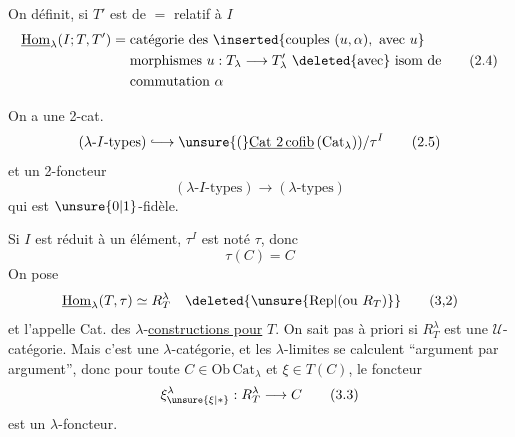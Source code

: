 On définit, si $T'$ est de $=$ relatif à $I$
\[
\begin{aligned}
\underline{\mathrm{Hom}}_\lambda(I;T,T')={}&\text{catégorie des }\inserted{\text{couples }(u,\alpha),\ \text{avec }u}\\
 &\text{morphismes } u:T_\lambda\longrightarrow T'_\lambda\ \text{\deleted{avec} isom de}\\
 &\text{commutation }\alpha
\end{aligned}\tag*{(2.4)}
\]

On a une  2-cat.
\[
(\lambda\text{-}I\text{-types})\lhook\joinrel\longrightarrow
\unsure{\text{(}}\underline{\mathrm{Cat}\ 2\,\mathrm{cofib}}\,(\mathrm{Cat}_{\lambda}))/\tau^{I}\tag*{(2.5)}
\]
et un 2-foncteur
\[
(\lambda\text{-}I\text{-types})\longrightarrow(\lambda\text{-types})\tag*{(2.6)}
\]
qui est $\unsure{0|1}$-fidèle.

 Si $I$ est réduit à un élément, $\tau^I$ est noté  $\tau$, donc
\[
\tau(C)=C\tag*{(3.1)}
\]
 On pose
\[
\underline{\mathrm{Hom}}_\lambda(T,\tau)\simeq R_T^\lambda\quad\deleted{\unsure{\mathrm{Rep}|(\text{ou }R_T)}}\tag*{(3,2)}
\]
et l'appelle Cat. des $\lambda$-\uline{constructions pour} $T$. On 
 sait pas à priori si $R_T^\lambda$ est une $\mathcal U$-catégorie. Mais
c'est une  $\lambda$-catégorie, et les $\lambda$-limites se calculent
``argument par argument'', donc pour toute $C\in\mathrm{Ob}\,\mathrm{Cat}_\lambda$
et $\xi\in T(C)$, le foncteur
\[
\xi_{\unsure{\xi|*}}^\lambda:R_T^\lambda\longrightarrow C\tag*{(3.3)}
\]
 est un $\lambda$-foncteur.


